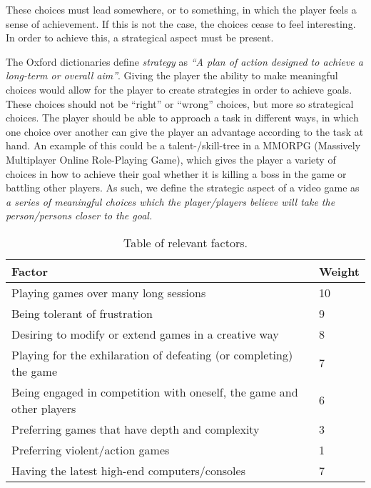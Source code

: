 These choices must lead somewhere, or to something, in which the player feels a sense of achievement. If this is not the case, the choices cease to feel interesting. In order to achieve this, a strategical aspect must be present.

The Oxford dictionaries define \textit{strategy} as \textit{``A plan of action designed to achieve a long-term or overall aim''}.\cite{strategyOx}
Giving the player the ability to make meaningful choices would allow for the player to create strategies in order to achieve goals.
These choices should not be ``right'' or ``wrong'' choices, but more so strategical choices. The player should be able to approach a task in different ways, in which one choice over another can give the player an advantage according to the task at hand. 
An example of this could be a talent-/skill-tree in a MMORPG (Massively Multiplayer Online Role-Playing Game), which gives the player a variety of choices in how to achieve their goal whether it is killing a boss in the game or battling other players.
As such, we define the strategic aspect of a video game as \emph{a series of meaningful choices which the player/players believe will take the person/persons closer to the goal.}

\begin{table}[h]
\begin{tabular}{|l|l|}
\hline
\rowcolor[HTML]{C0C0C0} 
Factor                                                                & Weight  \\ \hline
Playing games over many long sessions                                 & 10     	\\ \hline
Being tolerant of frustration                                         & 9       \\ \hline
Desiring to modify or extend games in a creative way                  & 8       \\ \hline
Playing for the exhilaration of defeating (or completing) the game    & 7       \\ \hline
Being engaged in competition with oneself, the game and other players & 6       \\ \hline
Preferring games that have depth and complexity                       & 3       \\ \hline
Preferring violent/action games                                       & 1       \\ \hline
Having the latest high-end computers/consoles                         & 7       \\ \hline
\end{tabular}
\caption{Table of relevant factors.}
\label{tab:relevantFactors}
\end{table}
